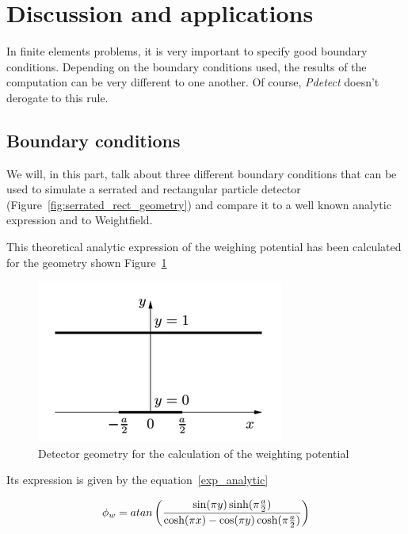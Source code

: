 \documentclass[11pt]{article}
\begin{document}

\section{Discussion and applications}

	In finite elements problems, it is very important to specify good boundary conditions.
	Depending on the boundary conditions used, the results of the computation can be very
	different to one another. Of course, \textit{Pdetect} doesn't derogate to this rule. 

	\subsection{Boundary conditions}

		We will, in this part, talk about three different boundary conditions that can be used 
		to simulate a serrated and rectangular particle detector 
		(Figure~\ref{fig:serrated_rect_geometry}) and compare it to a well known analytic 
		expression and to Weightfield.

		This theoretical analytic expression of the weighing potential has been calculated for
		the geometry shown Figure~\ref{fig:analytic}

		\begin{figure}[H]
			\center
			\includegraphics[scale=0.5]{images/boundary_conditions/analytic.png}
			\caption{Detector geometry for the calculation of the weighting 
				potential~\cite{pixeldetector}}
			\label{fig:analytic}
		\end{figure}

		Its expression is given by the equation~\ref{exp_analytic}

		\begin{equation}
			\phi_w = atan\left({\sin(\pi y)\sinh(\pi {a\over{2}})\over
					{\cosh(\pi x)-\cos(\pi y)\cosh(\pi {a\over{2}})}}\right)
			\label{exp_analytic}
		\end{equation}
\end{document}
